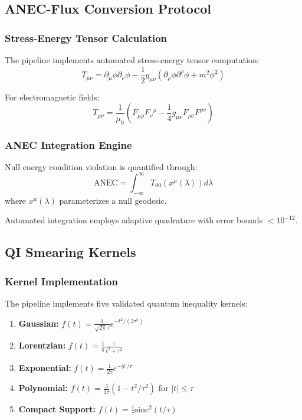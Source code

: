 \documentclass[11pt]{article}
\begin{document}
\subsection*{ANEC-Flux Conversion Protocol}

\subsubsection*{Stress-Energy Tensor Calculation}
The pipeline implements automated stress-energy tensor computation:
\[
  T_{\mu\nu} = \partial_\mu \phi \partial_\nu \phi - \frac{1}{2}g_{\mu\nu}\left(\partial_\rho \phi \partial^\rho \phi + m^2\phi^2\right)
\]

For electromagnetic fields:
\[
  T_{\mu\nu} = \frac{1}{\mu_0}\left(F_{\mu\rho}F_\nu{}^\rho - \frac{1}{4}g_{\mu\nu}F_{\rho\sigma}F^{\rho\sigma}\right)
\]

\subsubsection*{ANEC Integration Engine}
Null energy condition violation is quantified through:
\[
  \text{ANEC} = \int_{-\infty}^{\infty} T_{00}(x^\mu(\lambda)) d\lambda
\]
where $x^\mu(\lambda)$ parameterizes a null geodesic.

Automated integration employs adaptive quadrature with error bounds $< 10^{-12}$.

\subsection*{QI Smearing Kernels}

\subsubsection*{Kernel Implementation}
The pipeline implements five validated quantum inequality kernels:
\begin{enumerate}
  \item \textbf{Gaussian:} $f(t) = \frac{1}{\sqrt{2\pi}\tau}e^{-t^2/(2\tau^2)}$
  \item \textbf{Lorentzian:} $f(t) = \frac{1}{\pi}\frac{\tau}{t^2 + \tau^2}$
  \item \textbf{Exponential:} $f(t) = \frac{1}{2\tau}e^{-|t|/\tau}$
  \item \textbf{Polynomial:} $f(t) = \frac{3}{4\tau}(1 - t^2/\tau^2)$ for $|t| \leq \tau$
  \item \textbf{Compact Support:} $f(t) = \frac{1}{\tau}\text{sinc}^2(t/\tau)$
\end{enumerate}
\end{document}
